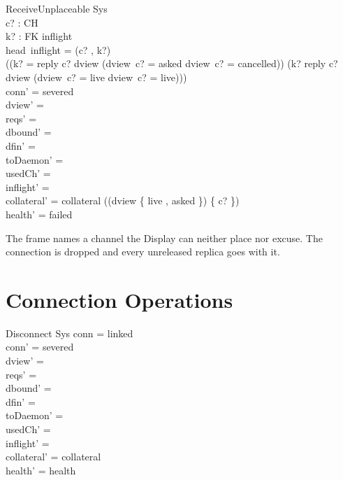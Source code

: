 \documentclass[a4paper,10pt,fleqn]{article}
\begin{document}
\begin{schema}{ReceiveUnplaceable}
  \Delta Sys \\
  c? : CH \\
  k? : FK
\where
  inflight \neq \langle \rangle \\
  head~inflight = (c? , k?) \\
  \lnot ((k? = reply \land c? \in \dom dview \land
      (dview~c? = asked \lor dview~c? = cancelled)) \lor
    (k? \neq reply \land c? \in \dom dview \land
      (dview~c? = live \lor dview~c? = live))) \\
  conn' = severed \\
  dview' = \emptyset \\
  reqs' = \emptyset \\
  dbound' = \emptyset \\
  dfin' = \emptyset \\
  toDaemon' = \emptyset \\
  usedCh' = \emptyset \\
  inflight' = \langle \rangle \\
  collateral' = collateral \cup
    (\dom (dview \rres \{ live , asked \}) \setminus \{ c? \}) \\
  health' = failed
\end{schema}

The frame names a channel the Display can neither place nor excuse.  The
connection is dropped and every unreleased replica goes with it.

\section{Connection Operations}

\begin{schema}{Disconnect}
  \Delta Sys
\where
  conn = linked \\
  conn' = severed \\
  dview' = \emptyset \\
  reqs' = \emptyset \\
  dbound' = \emptyset \\
  dfin' = \emptyset \\
  toDaemon' = \emptyset \\
  usedCh' = \emptyset \\
  inflight' = \langle \rangle \\
  collateral' = collateral \\
  health' = health
\end{schema}
\end{document}
